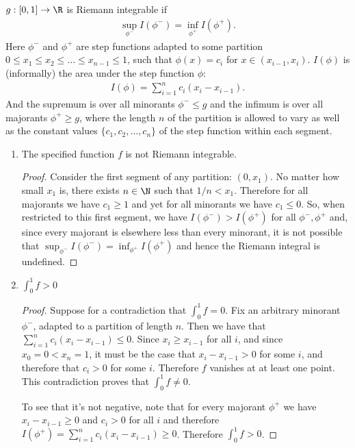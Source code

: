 \begin{definition*}
  $g: [0, 1] \to \R$ is Riemann integrable if
  \begin{align*}
    \sup_{\phi^-} I(\phi^-) = \inf_{\phi^+} I(\phi^+).
  \end{align*}
  Here $\phi^-$ and $\phi^+$ are step functions adapted​ to some
  partition $0 \leq x_1 \leq x_2 \leq \ldots \leq x_{n-1} \leq 1$, such that $\phi(x) = c_i$
  for $x \in (x_{i-1}, x_i)$. $I(\phi)$ is (informally) the area under the step function $\phi$:
  \begin{align*}
    I(\phi) = \sum_{i=1}^n c_i(x_i - x_{i-1}).
  \end{align*}
  And the supremum is over all minorants $\phi^- \leq g$ and the infimum is over all
  majorants $\phi^+ \geq g$, where the length $n$ of the partition is allowed to vary as well as the constant
  values $\{c_1, c_2, \ldots, c_n\}$ of the step function within each segment.
\end{definition*}

\begin{enumerate}[label=(6.\arabic*)]
\item
  \begin{claim*}
    The specified function $f$ is not Riemann integrable.
  \end{claim*}

  \begin{proof}
    Consider the first segment of any partition: $(0, x_1)$. No matter how small $x_1$ is, there
    exists $n \in \N$ such that $1/n < x_1$. Therefore for all majorants we have $c_1 \geq 1$ and yet for all
    minorants we have $c_1 \leq 0$. So, when restricted to this first segment, we have $I(\phi^-) > I(\phi^+)$
    for all $\phi^-, \phi^+$ and, since every majorant is elsewhere less than every minorant, it is not
    possible that $\sup_{\phi^-} I(\phi^-) = \inf_{\phi^+} I(\phi^+)$ and hence the Riemann integral is
    undefined.
  \end{proof}

\item
  \begin{claim*}
    $\int_0^1 f > 0$
  \end{claim*}
  \begin{proof}
    Suppose for a contradiction that $\int_0^1 f = 0$. Fix an arbitrary minorant $\phi^-$, adapted to a
    partition of length $n$. Then we have that $\sum_{i=1}^n c_i(x_i - x_{i-1}) \leq 0$.
    Since $x_i \geq x_{i-1}$ for all $i$, and since $x_0 = 0 < x_n = 1$, it must be the case
    that $x_i - x_{i-1} > 0$ for some $i$, and therefore that $c_i > 0$ for some $i$. Therefore $f$ vanishes at
    at least one point. This contradiction proves that $\int_0^1 f \neq 0$.

    To see that it's not negative, note that for every majorant $\phi^+$ we have $x_i - x_{i-1} \geq 0$
    and $c_i > 0$ for all $i$ and therefore $I(\phi^+) = \sum_{i=1}^n c_i(x_i - x_{i-1}) \geq 0$. Therefore $\int_0^1 f > 0$.
  \end{proof}

\end{enumerate}


